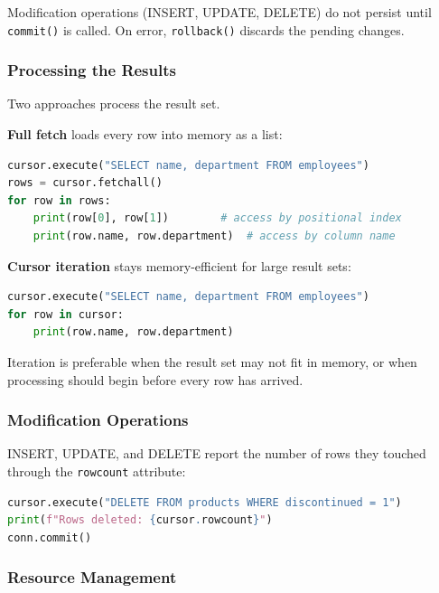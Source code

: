Modification operations (INSERT, UPDATE, DELETE) do not persist until \texttt{commit()} is called. On error, \texttt{rollback()} discards the pending changes.

\subsubsection{Processing the Results}
\label{subsec:pyodbc-results}

Two approaches process the result set.

\textbf{Full fetch} loads every row into memory as a list:
\begin{lstlisting}[language=Python, basicstyle=\ttfamily\scriptsize]
cursor.execute("SELECT name, department FROM employees")
rows = cursor.fetchall()
for row in rows:
    print(row[0], row[1])        # access by positional index
    print(row.name, row.department)  # access by column name
\end{lstlisting}

\textbf{Cursor iteration} stays memory-efficient for large result sets:
\begin{lstlisting}[language=Python, basicstyle=\ttfamily\scriptsize]
cursor.execute("SELECT name, department FROM employees")
for row in cursor:
    print(row.name, row.department)
\end{lstlisting}

Iteration is preferable when the result set may not fit in memory, or when processing should begin before every row has arrived.

\subsubsection{Modification Operations}
\label{subsec:pyodbc-modifications}

INSERT, UPDATE, and DELETE report the number of rows they touched through the \texttt{rowcount} attribute:

\begin{lstlisting}[language=Python, basicstyle=\ttfamily\scriptsize]
cursor.execute("DELETE FROM products WHERE discontinued = 1")
print(f"Rows deleted: {cursor.rowcount}")
conn.commit()
\end{lstlisting}

\subsubsection{Resource Management}
\label{subsec:resource-management}

